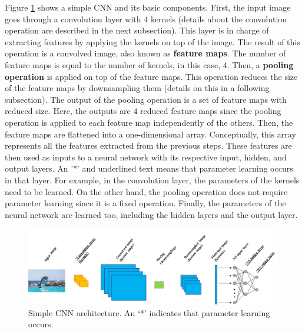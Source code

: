 \documentclass[
  11pt,
]{krantz}
\begin{document}
Figure \ref{fig:cnnArchitecture} shows a simple CNN and its basic components. First, the input image goes through a convolution layer with \(4\) kernels (details about the convolution operation are described in the next subsection). This layer is in charge of extracting features by applying the kernels on top of the image. The result of this operation is a convolved image, also known as \textbf{feature maps}. The number of feature maps is equal to the number of kernels, in this case, \(4\). Then, a \textbf{pooling operation} is applied on top of the feature maps. This operation reduces the size of the feature maps by downsampling them (details on this in a following subsection). The output of the pooling operation is a set of feature maps with reduced size. Here, the outputs are \(4\) reduced feature maps since the pooling operation is applied to each feature map independently of the others. Then, the feature maps are flattened into a one-dimensional array. Conceptually, this array represents all the features extracted from the previous steps. These features are then used as inputs to a neural network with its respective input, hidden, and output layers. An '*' and underlined text means that parameter learning occurs in that layer. For example, in the convolution layer, the parameters of the kernels need to be learned. On the other hand, the pooling operation does not require parameter learning since it is a fixed operation. Finally, the parameters of the neural network are learned too, including the hidden layers and the output layer.



\begin{figure}

{\centering \includegraphics[width=1\linewidth]{images/cnn_architecture} 

}

\caption{Simple CNN architecture. An `*' indicates that parameter learning occurs.}\label{fig:cnnArchitecture}
\end{figure}
\end{document}

